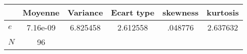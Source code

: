 \begin{tabular}{l*{1}{ccccc}}
\toprule
            &        Moyenne&         Variance&          Ecart type&    skewness&    kurtosis\\
\midrule
$e$           &    7.16e-09&    6.825458&    2.612558&     .048776&    2.637632\\
\midrule
\(N\)       &          96&            &            &            &            \\
\bottomrule
\end{tabular}
